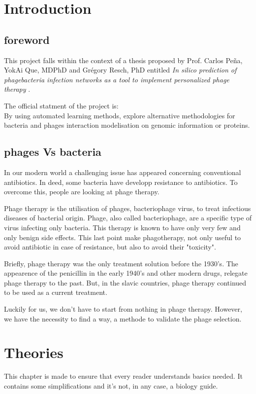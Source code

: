 \documentclass[a4paper,11pt]{report}
\begin{document}
\tableofcontents


\chapter{Introduction}
\section{foreword}
This project falls within the context of a thesis proposed by Prof. Carlos Peña, YokAi
Que, MDPhD and Grégory Resch, PhD entitled \textit{In silico prediction of phagebacteria
infection networks as a tool to implement personalized phage therapy} \cite{ref1}.

The official statment of the project is:\\
By using automated learning methods, explore alternative methodologies for bacteria and phages interaction modelisation on genomic information or proteins.


\section{phages Vs bacteria}
In our modern world a challenging issue has appeared concerning conventional antibiotics. In deed, some bacteria have developp resistance to antibiotics. To overcome this, people are looking at phage therapy. 

Phage therapy is the utilisation of phages, bacteriophage virus, to treat infectious diseases of bacterial origin. Phage, also called bacteriophage, are a specific type of virus infecting only bacteria. This therapy is known to have only very few and only benign side effects. This last point make phagotherapy, not only useful to avoid antibiotic in case of resistance, but also to avoid their "toxicity".

Briefly, phage therapy was the only treatment solution before the 1930's. The appearence of the penicillin in the early 1940's and other modern drugs, relegate phage therapy to the past. But, in the slavic countries, phage therapy continued to be used as a current treatment.

Luckily for us, we don't have to start from nothing in phage therapy. However, we have the necessity to find a way, a methode to validate the phage selection. \cite{ref2}


\chapter{Theories}
This chapter is made to ensure that every reader understands basics needed. It contains some simplifications and it's not, in any case, a biology guide.
\vspace{-0.6cm}
\end{document}
